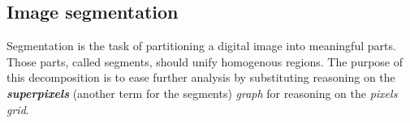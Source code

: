 \subsection{Image segmentation}
Segmentation is the task of partitioning a digital image into meaningful parts. Those parts, called segments, should unify homogenous regions. The purpose of this decomposition is to ease further analysis by substituting reasoning on the \textit{\textbf{superpixels}} (another term for the segments) {\it graph} for reasoning on the {\it pixels grid}. %


%

